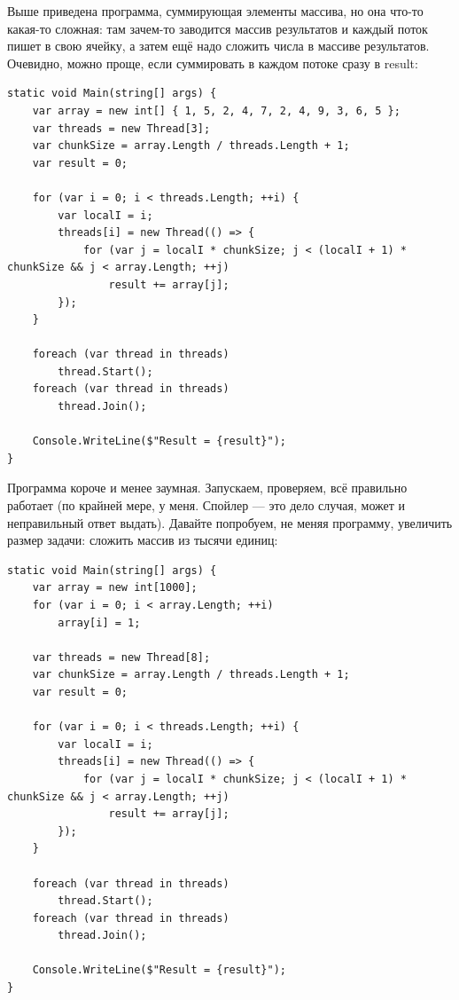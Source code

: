 \documentclass[a5paper]{article}
\begin{document}
Выше приведена программа, суммирующая элементы массива, но она что-то какая-то сложная: там зачем-то заводится массив результатов и каждый поток пишет в свою ячейку, а затем ещё надо сложить числа в массиве результатов. Очевидно, можно проще, если суммировать в каждом потоке сразу в result:

\begin{small}
    \begin{verbatim}
static void Main(string[] args) {
    var array = new int[] { 1, 5, 2, 4, 7, 2, 4, 9, 3, 6, 5 };
    var threads = new Thread[3];
    var chunkSize = array.Length / threads.Length + 1;
    var result = 0;

    for (var i = 0; i < threads.Length; ++i) {
        var localI = i;
        threads[i] = new Thread(() => {
            for (var j = localI * chunkSize; j < (localI + 1) * chunkSize && j < array.Length; ++j)
                result += array[j];
        });
    }

    foreach (var thread in threads)
        thread.Start();
    foreach (var thread in threads)
        thread.Join();

    Console.WriteLine($"Result = {result}");
}
    \end{verbatim}
\end{small}

Программа короче и менее заумная. Запускаем, проверяем, всё правильно работает (по крайней мере, у меня. Спойлер --- это дело случая, может и неправильный ответ выдать). Давайте попробуем, не меняя программу, увеличить размер задачи: сложить массив из тысячи единиц:

\begin{small}
    \begin{verbatim}
static void Main(string[] args) {
    var array = new int[1000];
    for (var i = 0; i < array.Length; ++i)
        array[i] = 1;

    var threads = new Thread[8];
    var chunkSize = array.Length / threads.Length + 1;
    var result = 0;

    for (var i = 0; i < threads.Length; ++i) {
        var localI = i;
        threads[i] = new Thread(() => {
            for (var j = localI * chunkSize; j < (localI + 1) * chunkSize && j < array.Length; ++j)
                result += array[j];
        });
    }

    foreach (var thread in threads)
        thread.Start();
    foreach (var thread in threads)
        thread.Join();

    Console.WriteLine($"Result = {result}");
}
    \end{verbatim}
\end{small}
\end{document}

